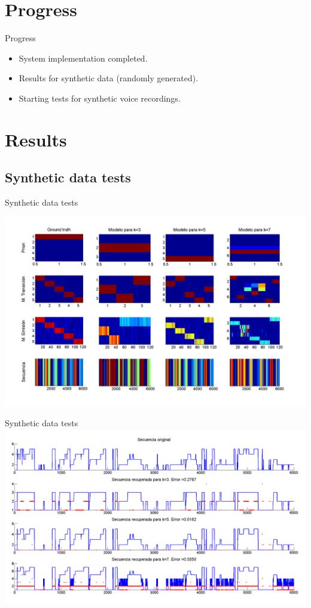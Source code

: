 \documentclass[10pt]{beamer}
\begin{document}
\section{Progress}
\begin{frame}{Progress}
  \begin{itemize}
    \itemsep 3em
    \item System implementation completed.
    \item Results for synthetic data (randomly generated).
    \item Starting tests for synthetic voice recordings.
  \end{itemize}
\end{frame}

\section{Results}
\subsection{Synthetic data tests}
\begin{frame}{Synthetic data tests}
  \begin{center}
    \includegraphics[height=0.65\textwidth]{gfx/pruebasg}
  \end{center}
\end{frame}

\begin{frame}{Synthetic data tests}
  \includegraphics[height=0.6\textwidth]{gfx/pruebasg_}
\end{frame}
\end{document}
